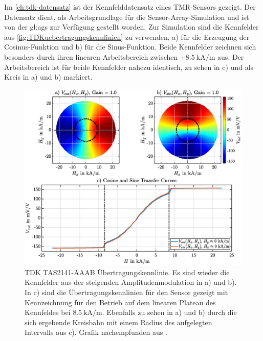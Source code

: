 \clearpage


Im \autoref{ch:tdk-datensatz} ist der Kennfelddatensatz eines TMR-Sensors \cite{TDK2016} gezeigt. Der Datensatz dient, als Arbeitsgrundlage für die Sensor-Array-Simulation und ist von der \gls{gl:ags} zur Verfügung gestellt worden. Zur Simulation sind die Kennfelder aus \autoref{fig:TDKuebertragungskennlinien} zu verwenden, a) für die Erzeugung der Cosinus-Funktion und b) für die Sinus-Funktion. Beide Kennfelder zeichnen sich besonders durch ihren linearen Arbeitsbereich zwischen $\pm\SI{8,5}{\kilo\ampere\per\metre}$ aus. Der Arbeitsbereich ist für beide Kennfelder nahezu identisch, zu sehen in c) und als Kreis in a) und b) markiert. 


\vspace{5mm}
\begin{figure}[tbph]
	\centering
	\includegraphics[width=.95\linewidth]{chapters/images/2-Grundlagen/TDK_Uebertragungskennlinien}
	\caption[TDK TAS2141-AAAB Übertragungskennlinie]{TDK TAS2141-AAAB Übertragungskennlinie. Es sind wieder die 
		Kennfelder aus der steigenden Amplitudenmodulation in a) und b). In c) sind die Übertragungskennlinien für den 
		Sensor gezeigt mit Kennzeichnung für den Betrieb auf dem linearen Plateau des Kennfeldes bei 
		$\SI{8.5}{\kilo\ampere\per\metre}$. Ebenfalls zu sehen in a) und b) durch die sich ergebende Kreisbahn mit einem 
		Radius des aufgelegten Intervalls aus c). Grafik nachempfunden aus \cite{Schuethe2019}.}
	\label{fig:TDKuebertragungskennlinien}
\end{figure}


\clearpage


